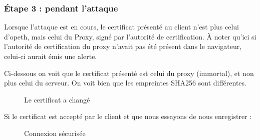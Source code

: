 \subsubsection{Étape 3 : pendant l'attaque}

Lorsque l'attaque est en cours, le certificat présenté au client n'est plus celui d'opeth, mais celui du Proxy, signé par l'autorité de certification. À noter qu'ici si l'autorité de certification du proxy n'avait pas été présent dans le navigateur, celui-ci aurait émis une alerte.

Ci-dessous on voit que le certificat présenté est celui du proxy (immortal), et non plus celui du serveur. On voit bien que les empreintes SHA256 sont différentes.

\begin{figure}[H]
  \caption{Le certificat a changé}
\end{figure}

Si le certificat est accepté par le client et que nous essayons de nous enregistrer :

\begin{figure}[H]
  \caption{Connexion sécurisée}
\end{figure}

